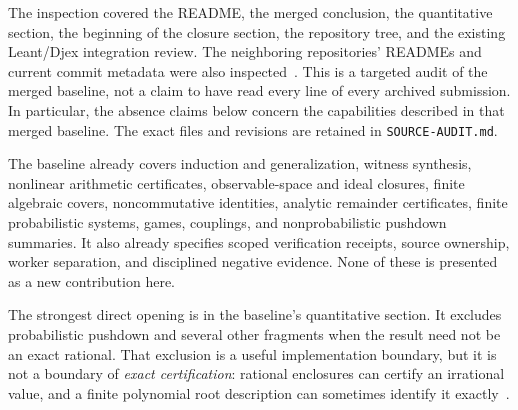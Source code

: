 \documentclass[11pt,a4paper]{article}
\theoremstyle{definition}\newtheorem{definition}[theorem]{Definition}
\theoremstyle{remark}\newtheorem{remark}[theorem]{Remark}
\newcommand{\code}[1]{\nolinkurl{#1}}
\begin{document}
The inspection covered the README, the merged conclusion, the quantitative section, the beginning of the closure section, the repository tree, and the existing Leant/Djex integration review. The neighboring repositories' READMEs and current commit metadata were also inspected~\cite{forge-quant,forge-closure,forge-neighbors,leant,djex}. This is a targeted audit of the merged baseline, not a claim to have read every line of every archived submission. In particular, the absence claims below concern the capabilities described in that merged baseline. The exact files and revisions are retained in \code{SOURCE-AUDIT.md}.

The baseline already covers induction and generalization, witness synthesis, nonlinear arithmetic certificates, observable-space and ideal closures, finite algebraic covers, noncommutative identities, analytic remainder certificates, finite probabilistic systems, games, couplings, and nonprobabilistic pushdown summaries. It also already specifies scoped verification receipts, source ownership, worker separation, and disciplined negative evidence. None of these is presented as a new contribution here.

The strongest direct opening is in the baseline's quantitative section. It excludes probabilistic pushdown and several other fragments when the result need not be an exact rational. That exclusion is a useful implementation boundary, but it is not a boundary of \emph{exact certification}: rational enclosures can certify an irrational value, and a finite polynomial root description can sometimes identify it exactly~\cite{forge-quant,etessami-yannakakis}.
\end{document}
